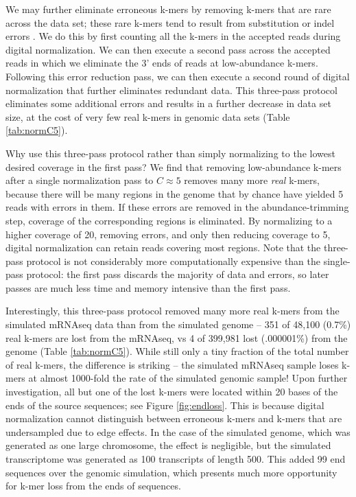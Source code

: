 \documentclass{pnastwo}
\begin{document}
\begin{article}
We may further eliminate erroneous k-mers by removing k-mers that are
rare across the data set; these rare k-mers tend to result from
substitution or indel errors \cite{pubmed21114842}.  We do this by
first counting all the k-mers in the accepted reads during digital
normalization.  We can then execute a second pass across the accepted
reads in which we eliminate the 3' ends of reads at low-abundance
k-mers.  Following this error reduction pass, we can then execute a
second round of digital normalization that further eliminates
redundant data.  This three-pass protocol eliminates some additional
errors and results in a further decrease in data set size, at the cost
of very few real k-mers in genomic data sets (Table \ref{tab:normC5}).

Why use this three-pass protocol rather than simply normalizing to the
lowest desired coverage in the first pass?  We find that removing
low-abundance k-mers after a single normalization pass to $C \approx
5$ removes many more {\em real} k-mers, because there will be many
regions in the genome that by chance have yielded 5 reads with errors
in them. If these errors are removed in the abundance-trimming step,
coverage of the corresponding regions is eliminated.  By normalizing
to a higher coverage of 20, removing errors, and only then reducing
coverage to 5, digital normalization can retain reads covering most
regions.  Note that the three-pass protocol is not considerably more
computationally expensive than the single-pass protocol: the first
pass discards the majority of data and errors, so later passes are
much less time and memory intensive than the first pass.

Interestingly, this three-pass protocol removed many more real k-mers
from the simulated mRNAseq data than from the simulated genome -- 351
of 48,100 (0.7\%) real k-mers are lost from the mRNAseq, vs 4 of
399,981 lost (.000001\%) from the genome (Table \ref{tab:normC5}).
While still only a tiny fraction of the total number of real k-mers,
the difference is striking -- the simulated mRNAseq sample loses k-mers
at almost 1000-fold the rate of the simulated genomic sample!  Upon
further investigation, all but one of the lost k-mers were located
within 20 bases of the ends of the source sequences; see Figure
\ref{fig:endloss}.  This is because digital normalization cannot
distinguish between erroneous k-mers and k-mers that are undersampled
due to edge effects.  In the case of the simulated genome, which was
generated as one large chromosome, the effect is negligible, but the
simulated transcriptome was generated as 100 transcripts of length
500.  This added 99 end sequences over the genomic simulation, which
presents much more opportunity for k-mer loss from the ends of
sequences.


\end{article}
\end{document}
